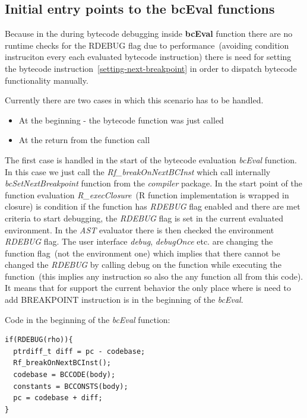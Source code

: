 \documentclass[thesis=M,english]{FITthesis}[2018/10/20]
\begin{document}
\subsection{Initial entry points to the bcEval functions}

Because in the during bytecode debugging inside \textbf{bcEval} function there are no runtime checks for the RDEBUG flag due to performance~(avoiding condition instruciton every each evaluated bytecode instruction) there is need for setting the bytecode instruction~\ref{setting-next-breakpoint} in order to dispatch bytecode functionality manually.

Currently there are two cases in which this scenario has to be handled.

\begin{itemize}
	\item At the beginning - the bytecode function was just called
	\item At the return from the function call
\end{itemize}

The first case is handled in the start of the bytecode evaluation \textit{bcEval} function. In this case we just call the \textit{Rf{\_}breakOnNextBCInst} which call internally \textit{bcSetNextBreakpoint} function from the \textit{compiler} package. In the start point of the function evaluation \textit{R{\_}execClosure}~(R function implementation is wrapped in closure) is condition if the function has \textit{RDEBUG} flag enabled and there are met criteria to start debugging, the \textit{RDEBUG} flag is set in the current evaluated environment. In the \textit{AST} evaluator there is then checked the environment \textit{RDEBUG} flag. The user interface \textit{debug}, \textit{debugOnce} etc. are changing the function flag~(not the environment one) which implies that there cannot be changed the \textit{RDEBUG} by calling debug on the function while executing the function~(this implies any instruction so also the any function all from this code). It means that for support the current behavior the only place where is need to add BREAKPOINT instruction is in the beginning of the \textit{bcEval}.

Code in the beginning of the \textit{bcEval} function:
\begin{lstlisting}
if(RDEBUG(rho)){
  ptrdiff_t diff = pc - codebase;
  Rf_breakOnNextBCInst();
  codebase = BCCODE(body);
  constants = BCCONSTS(body);
  pc = codebase + diff;
}
\end{lstlisting}
\end{document}
